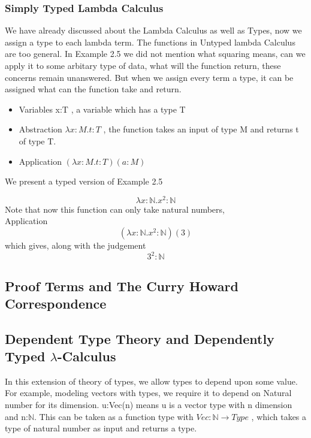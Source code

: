 \documentclass[12pt]{article}
\begin{document}
\subsubsection{Simply Typed Lambda Calculus}
 We have already discussed about the Lambda Calculus as well as Types, now we assign a type to each lambda term. The functions in Untyped lambda Calculus are too general. In Example 2.5 we did not mention what squaring means, can we apply it to some arbitary type of data, what will the function return, these concerns remain unanswered. But when we assign every term a type, it can be assigned what can the function take and return.
 \begin{itemize}
    \item Variables  x:T , a variable which has a type T
    \item Abstraction $\lambda x:M.t:T$ , the function takes an input of type M and returns t of type T.
    \item Application $(\lambda x:M.t:T)(a:M)$
    


 \end{itemize}
 
 We present a typed version of Example 2.5\\
 \begin{example}
    $$\lambda x:\mathbb{N}.x^2:\mathbb{N}$$
    Note that now this function can only take natural numbers,\\
    Application
    $$(\lambda x:\mathbb{N}.x^2:\mathbb{N})(3)$$
    which gives, along with the judgement
    $$3^2:\mathbb{N}$$
 \end{example}

\subsection{Proof Terms and The Curry Howard Correspondence}


\subsection{Dependent Type Theory and Dependently Typed $\lambda$-Calculus}
In this extension of theory of types, we allow types to depend upon some value. For example, modeling vectors with types, we require it to depend on Natural number for its dimension. 
u:Vec(n) means u is a vector type with n dimension and n:$\mathbb{N}$. 
This can be taken as a function type with $Vec:\mathbb{N} \to Type$ , which takes a type of natural number as input and returns a type. 
\end{document}
